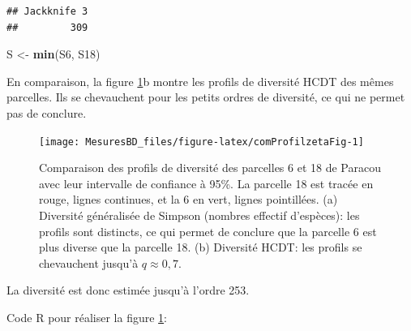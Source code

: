 \documentclass[
  11pt,
  french,
  a4paper,
  extrafontsizes,onecolumn,openright
  ]{memoir}
\newenvironment{Shaded}{\begin{snugshade}}{\end{snugshade}}
\newcommand{\DataTypeTok}[1]{\textcolor[rgb]{0.13,0.29,0.53}{#1}}
\newcommand{\DecValTok}[1]{\textcolor[rgb]{0.00,0.00,0.81}{#1}}
\newcommand{\KeywordTok}[1]{\textcolor[rgb]{0.13,0.29,0.53}{\textbf{#1}}}
\newcommand{\NormalTok}[1]{#1}
\newcommand{\OperatorTok}[1]{\textcolor[rgb]{0.81,0.36,0.00}{\textbf{#1}}}
\newcommand{\StringTok}[1]{\textcolor[rgb]{0.31,0.60,0.02}{#1}}
\begin{document}
\begin{Shaded}
\end{Shaded}

\begin{verbatim}
## Jackknife 3 
##         309
\end{verbatim}

\begin{Shaded}
\begin{Highlighting}[]
\NormalTok{S <-}\StringTok{ }\KeywordTok{min}\NormalTok{(S6, S18)}
\end{Highlighting}
\end{Shaded}

\normalsize

En comparaison, la figure \ref{fig:comProfilzetaFig}b montre les profils de diversité HCDT des mêmes parcelles.
Ils se chevauchent pour les petits ordres de diversité, ce qui ne permet pas de conclure.



\scriptsize

\begin{figure}

{\centering \texttt{[image: MesuresBD\_files/figure-latex/comProfilzetaFig-1]} 

}

\caption{Comparaison des profils de diversité des parcelles 6 et 18 de Paracou avec leur intervalle de confiance à 95\%. La parcelle 18 est tracée en rouge, lignes continues, et la 6 en vert, lignes pointillées. (a) Diversité généralisée de Simpson (nombres effectif d'espèces): les profils sont distincts, ce qui permet de conclure que la parcelle 6 est plus diverse que la parcelle 18. (b) Diversité HCDT: les profils se chevauchent jusqu'à \(q \approx 0,7\).}\label{fig:comProfilzetaFig}
\end{figure}

\normalsize

La diversité est donc estimée jusqu'à l'ordre 253.

Code R pour réaliser la figure \ref{fig:comProfilzetaFig}:

\scriptsize
\end{document}
